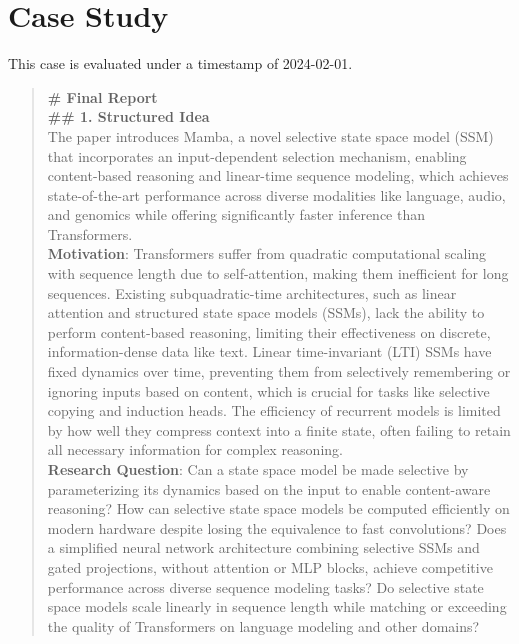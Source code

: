 \section{Case Study}
This case is evaluated under a timestamp of 2024-02-01.
\begin{quote}
    \begin{tcolorbox}[breakable,colback=almond!20!white, colframe=almond!60!black, title=\textbf{Case Study (Mamba: Linear-Time Sequence Modeling with Selective State Spaces)}]
    \label{app:case}
        \small
        \textbf{\# Final Report}\\
        
        \textbf{\#\# 1. Structured Idea}\\
        The paper introduces Mamba, a novel selective state space model (SSM) that incorporates an input-dependent selection mechanism, enabling content-based reasoning and linear-time sequence modeling, which achieves state-of-the-art performance across diverse modalities like language, audio, and genomics while offering significantly faster inference than Transformers.\\
        \textbf{Motivation}: Transformers suffer from quadratic computational scaling with sequence length due to self-attention, making them inefficient for long sequences. Existing subquadratic-time architectures, such as linear attention and structured state space models (SSMs), lack the ability to perform content-based reasoning, limiting their effectiveness on discrete, information-dense data like text. Linear time-invariant (LTI) SSMs have fixed dynamics over time, preventing them from selectively remembering or ignoring inputs based on content, which is crucial for tasks like selective copying and induction heads. The efficiency of recurrent models is limited by how well they compress context into a finite state, often failing to retain all necessary information for complex reasoning.\\
        \textbf{Research Question}: Can a state space model be made selective by parameterizing its dynamics based on the input to enable content-aware reasoning? How can selective state space models be computed efficiently on modern hardware despite losing the equivalence to fast convolutions? Does a simplified neural network architecture combining selective SSMs and gated projections, without attention or MLP blocks, achieve competitive performance across diverse sequence modeling tasks? Do selective state space models scale linearly in sequence length while matching or exceeding the quality of Transformers on language modeling and other domains?\\

\end{tcolorbox}
\end{quote}

